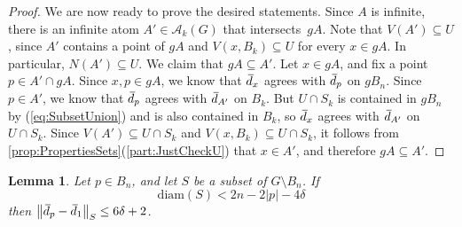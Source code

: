 \documentclass[11pt,letterpaper]{amsart}
\newtheorem{lemma}[theorem]{Lemma}
\theoremstyle{definition}
\newcommand{\A}{\mathcal{A}}
\newcommand{\od}{\mkern 3mu\overline{\mkern-3mu d\mkern 1.5mu}\mkern-1.5mu}
\begin{document}
\begin{proof}
We are now ready to prove the desired statements.  Since $A$ is infinite, there is an infinite atom $A'\in\A_k(G)$ that intersects~$gA$. Note that $V(A')\subseteq U$, since $A'$ contains a point of $gA$ and $V(x,B_k)\subseteq U$ for every $x\in gA$.  In particular, $N(A')\subseteq U$.  We claim that $gA\subseteq A'$. Let $x\in gA$, and fix a point $p\in A'\cap gA$. Since $x,p\in gA$, we know that $\od_x$ agrees with $\od_p$ on $gB_n$.
Since $p\in A'$, we know that $\od_p$ agrees with $\od_{A'}$ on $B_k$.  But $U\cap S_k$ is contained in $gB_n$ by (\ref{eq:SubsetUnion}) and is also contained in $B_k$, so $\od_x$ agrees with $\od_{A'}$ on $U\cap S_k$. 
 Since $V(A')\subseteq U\cap S_k$ and $V(x,B_k)\subseteq U\cap S_k$, it follows from \cref{prop:PropertiesSets}(\ref{part:JustCheckU}) that $x\in A'$, and therefore $gA\subseteq A'$.
\end{proof}

\begin{lemma}\label{lem:DistanceFunctionNotChanging}
Let $p\in B_n$, and let $S$ be a subset of $G\setminus B_n$.  If
\[
\mathrm{diam}(S) < 2n-2|p|-4\delta
\]
then $\bigl\|\od_p-\od_{1}\bigr\|_S\leq 6\delta+2$.
\end{lemma}
\end{document}

